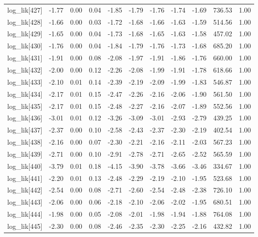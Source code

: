 \begin{table}[ht]
\begin{tabular}{rrrrrrrrrrr}
  log\_lik[427] & -1.77 & 0.00 & 0.04 & -1.85 & -1.79 & -1.76 & -1.74 & -1.69 & 736.53 & 1.00 \\ 
  log\_lik[428] & -1.66 & 0.00 & 0.03 & -1.72 & -1.68 & -1.66 & -1.63 & -1.59 & 514.56 & 1.00 \\ 
  log\_lik[429] & -1.65 & 0.00 & 0.04 & -1.73 & -1.68 & -1.65 & -1.63 & -1.58 & 457.02 & 1.00 \\ 
  log\_lik[430] & -1.76 & 0.00 & 0.04 & -1.84 & -1.79 & -1.76 & -1.73 & -1.68 & 685.20 & 1.00 \\ 
  log\_lik[431] & -1.91 & 0.00 & 0.08 & -2.08 & -1.97 & -1.91 & -1.86 & -1.76 & 660.00 & 1.00 \\ 
  log\_lik[432] & -2.00 & 0.00 & 0.12 & -2.26 & -2.08 & -1.99 & -1.91 & -1.78 & 618.66 & 1.00 \\ 
  log\_lik[433] & -2.10 & 0.01 & 0.14 & -2.39 & -2.19 & -2.09 & -1.99 & -1.83 & 546.87 & 1.00 \\ 
  log\_lik[434] & -2.17 & 0.01 & 0.15 & -2.47 & -2.26 & -2.16 & -2.06 & -1.90 & 561.50 & 1.00 \\ 
  log\_lik[435] & -2.17 & 0.01 & 0.15 & -2.48 & -2.27 & -2.16 & -2.07 & -1.89 & 552.56 & 1.00 \\ 
  log\_lik[436] & -3.01 & 0.01 & 0.12 & -3.26 & -3.09 & -3.01 & -2.93 & -2.79 & 439.25 & 1.00 \\ 
  log\_lik[437] & -2.37 & 0.00 & 0.10 & -2.58 & -2.43 & -2.37 & -2.30 & -2.19 & 402.54 & 1.00 \\ 
  log\_lik[438] & -2.16 & 0.00 & 0.07 & -2.30 & -2.21 & -2.16 & -2.11 & -2.03 & 567.23 & 1.00 \\ 
  log\_lik[439] & -2.71 & 0.00 & 0.10 & -2.91 & -2.78 & -2.71 & -2.65 & -2.52 & 565.59 & 1.00 \\ 
  log\_lik[440] & -3.79 & 0.01 & 0.18 & -4.15 & -3.90 & -3.78 & -3.66 & -3.46 & 334.67 & 1.00 \\ 
  log\_lik[441] & -2.20 & 0.01 & 0.13 & -2.48 & -2.29 & -2.19 & -2.10 & -1.95 & 523.68 & 1.00 \\ 
  log\_lik[442] & -2.54 & 0.00 & 0.08 & -2.71 & -2.60 & -2.54 & -2.48 & -2.38 & 726.10 & 1.00 \\ 
  log\_lik[443] & -2.06 & 0.00 & 0.06 & -2.18 & -2.10 & -2.06 & -2.02 & -1.95 & 680.51 & 1.00 \\ 
  log\_lik[444] & -1.98 & 0.00 & 0.05 & -2.08 & -2.01 & -1.98 & -1.94 & -1.88 & 764.08 & 1.00 \\ 
  log\_lik[445] & -2.30 & 0.00 & 0.08 & -2.46 & -2.35 & -2.30 & -2.25 & -2.16 & 432.82 & 1.00 \\ 

\end{tabular}
\end{table}
